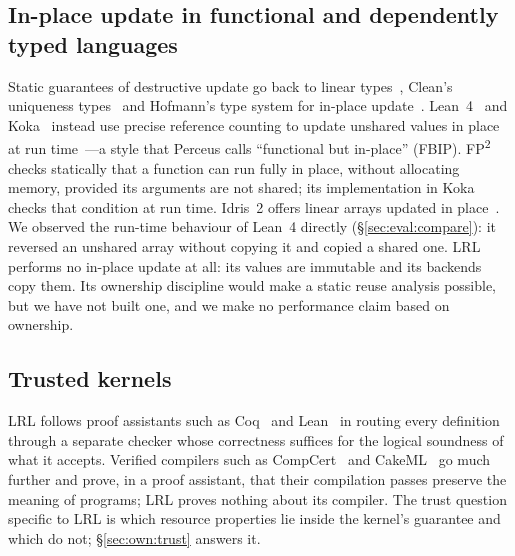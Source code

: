 \subsection{In-place update in functional and dependently typed languages}\label{sec:related:inplace}

Static guarantees of destructive update go back to linear types~\cite{wadler1990}, Clean's uniqueness types~\cite{barendsen1996uniqueness} and Hofmann's type system for in-place update~\cite{hofmann2000inplace}.
Lean~4~\cite{lean42021} and Koka~\cite{leijen2014koka} instead use precise reference counting to update unshared values in place at run time~\cite{ullrich2019beans,reinking2021perceus,lorenzen2022frame}---a style that Perceus calls ``functional but in-place'' (FBIP). FP\textsuperscript{2}~\cite{lorenzen2023fp2} checks statically that a function can run fully in place, without allocating memory, provided its arguments are not shared; its implementation in Koka checks that condition at run time.
Idris~2 offers linear arrays updated in place~\cite{brady2021}.
We observed the run-time behaviour of Lean~4 directly (\S\ref{sec:eval:compare}): it reversed an unshared array without copying it and copied a shared one.
LRL performs no in-place update at all: its values are immutable and its backends copy them.
Its ownership discipline would make a static reuse analysis possible, but we have not built one, and we make no performance claim based on ownership.

\subsection{Trusted kernels}\label{sec:related:kernels}

LRL follows proof assistants such as Coq~\cite{bertot2004coqart} and Lean~\cite{lean2015,lean42021} in routing every definition through a separate checker whose correctness suffices for the logical soundness of what it accepts.
Verified compilers such as CompCert~\cite{leroy2009compcert} and CakeML~\cite{kumar2014cakeml} go much further and prove, in a proof assistant, that their compilation passes preserve the meaning of programs; LRL proves nothing about its compiler.
The trust question specific to LRL is which resource properties lie inside the kernel's guarantee and which do not; \S\ref{sec:own:trust} answers it.

